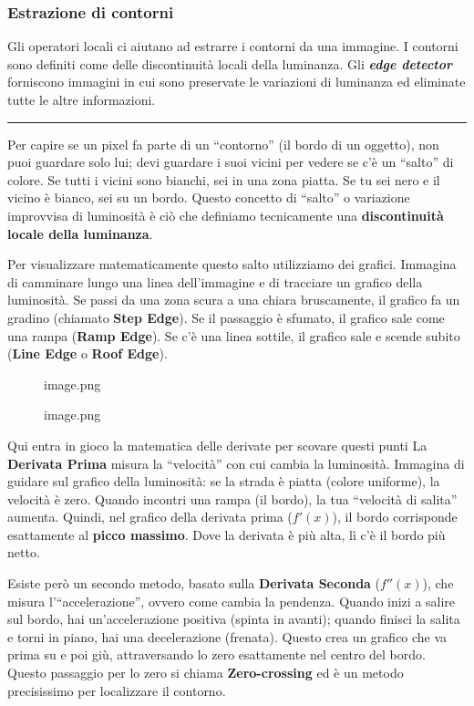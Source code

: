 \documentclass[
]{article}
\begin{document}
\hypertarget{estrazione-di-contorni}{%
\subsubsection{Estrazione di contorni}\label{estrazione-di-contorni}}

Gli operatori locali ci aiutano ad estrarre i contorni da una immagine.
I contorni sono definiti come delle discontinuità locali della luminanza.
Gli \textbf{\emph{edge detector}} forniscono immagini in cui sono preservate le variazioni di luminanza ed eliminate tutte le altre informazioni.

\begin{center}\rule{0.5\linewidth}{0.5pt}\end{center}

Per capire se un pixel fa parte di un ``contorno'' (il bordo di un oggetto), non puoi guardare solo lui; devi guardare i suoi vicini per vedere se c'è un ``salto'' di colore. Se tutti i vicini sono bianchi, sei in una zona piatta. Se tu sei nero e il vicino è bianco, sei su un bordo. Questo concetto di ``salto'' o variazione improvvisa di luminosità è ciò che definiamo tecnicamente una \textbf{discontinuità locale della luminanza}.

Per visualizzare matematicamente questo salto utilizziamo dei grafici. Immagina di camminare lungo una linea dell'immagine e di tracciare un grafico della luminosità. Se passi da una zona scura a una chiara bruscamente, il grafico fa un gradino (chiamato \textbf{Step Edge}). Se il passaggio è sfumato, il grafico sale come una rampa (\textbf{Ramp Edge}). Se c'è una linea sottile, il grafico sale e scende subito (\textbf{Line Edge} o \textbf{Roof Edge}).

\begin{figure}
\centering
{image.png}
\caption{image.png}
\end{figure}

Qui entra in gioco la matematica delle derivate per scovare questi punti
La \textbf{Derivata Prima} misura la ``velocità'' con cui cambia la luminosità. Immagina di guidare sul grafico della luminosità: se la strada è piatta (colore uniforme), la velocità è zero. Quando incontri una rampa (il bordo), la tua ``velocità di salita'' aumenta. Quindi, nel grafico della derivata prima (\(f'(x)\)), il bordo corrisponde esattamente al \textbf{picco massimo}. Dove la derivata è più alta, lì c'è il bordo più netto.

Esiste però un secondo metodo, basato sulla \textbf{Derivata Seconda} (\(f''(x)\)), che misura l'``accelerazione'', ovvero come cambia la pendenza. Quando inizi a salire sul bordo, hai un'accelerazione positiva (spinta in avanti); quando finisci la salita e torni in piano, hai una decelerazione (frenata). Questo crea un grafico che va prima su e poi giù, attraversando lo zero esattamente nel centro del bordo. Questo passaggio per lo zero si chiama \textbf{Zero-crossing} ed è un metodo precisissimo per localizzare il contorno.
\end{document}
